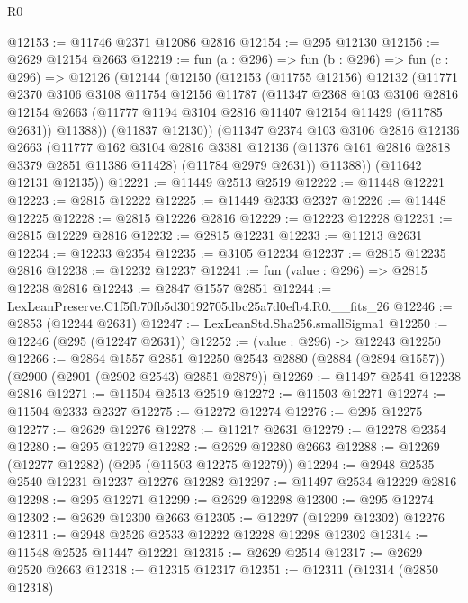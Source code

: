 \begin{lexlean}{R0}
\begin{coremodule}
@12153 := @11746 @2371 @12086 @2816
@12154 := @295 @12130
@12156 := @2629 @12154 @2663
@12219 := fun (a : @296) =>
  fun (b : @296) =>
  fun (c : @296) =>
  @12126
    (@12144
      (@12150
        (@12153
          (@11755 @12156)
          @12132
          (@11771
            @2370
            @3106
            @3108
            @11754
            @12156
            @11787
            (@11347
              @2368
              @103
              @3106
              @2816
              @12154
              @2663
              (@11777 @1194 @3104 @2816 @11407 @12154 @11429 (@11785 @2631))
              @11388))
          (@11837 @12130))
        (@11347
          @2374
          @103
          @3106
          @2816
          @12136
          @2663
          (@11777
            @162
            @3104
            @2816
            @3381
            @12136
            (@11376 @161 @2816 @2818 @3379 @2851 @11386 @11428)
            (@11784 @2979 @2631))
          @11388))
      (@11642 @12131 @12135))
@12221 := @11449 @2513 @2519
@12222 := @11448 @12221
@12223 := @2815 @12222
@12225 := @11449 @2333 @2327
@12226 := @11448 @12225
@12228 := @2815 @12226 @2816
@12229 := @12223 @12228
@12231 := @2815 @12229 @2816
@12232 := @2815 @12231
@12233 := @11213 @2631
@12234 := @12233 @2354
@12235 := @3105 @12234
@12237 := @2815 @12235 @2816
@12238 := @12232 @12237
@12241 := fun (value : @296) => @2815 @12238 @2816
@12243 := @2847 @1557 @2851
@12244 := LexLeanPreserve.C1f5fb70fb5d30192705dbc25a7d0efb4.R0.__fits_26
@12246 := @2853 (@12244 @2631)
@12247 := LexLeanStd.Sha256.smallSigma1
@12250 := @12246 (@295 (@12247 @2631))
@12252 := (value : @296) -> @12243 @12250
@12266 := @2864
    @1557
    @2851
    @12250
    @2543
    @2880
    (@2884 (@2894 @1557))
    (@2900 (@2901 (@2902 @2543) @2851 @2879))
@12269 := @11497 @2541 @12238 @2816
@12271 := @11504 @2513 @2519
@12272 := @11503 @12271
@12274 := @11504 @2333 @2327
@12275 := @12272 @12274
@12276 := @295 @12275
@12277 := @2629 @12276
@12278 := @11217 @2631
@12279 := @12278 @2354
@12280 := @295 @12279
@12282 := @2629 @12280 @2663
@12288 := @12269 (@12277 @12282) (@295 (@11503 @12275 @12279))
@12294 := @2948 @2535 @2540 @12231 @12237 @12276 @12282
@12297 := @11497 @2534 @12229 @2816
@12298 := @295 @12271
@12299 := @2629 @12298
@12300 := @295 @12274
@12302 := @2629 @12300 @2663
@12305 := @12297 (@12299 @12302) @12276
@12311 := @2948 @2526 @2533 @12222 @12228 @12298 @12302
@12314 := @11548 @2525 @11447 @12221
@12315 := @2629 @2514
@12317 := @2629 @2520 @2663
@12318 := @12315 @12317
@12351 := @12311
    (@12314
      (@2850 @12318)

\end{coremodule}
\end{lexlean}
